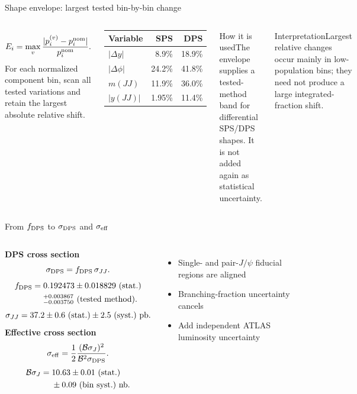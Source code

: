 \documentclass[11pt,aspectratio=169]{beamer}
\begin{document}
\begin{frame}{Shape envelope: largest tested bin-by-bin change}
\begin{columns}[T]\[E_i=\max_v\frac{|p_i^{(v)}-p_i^{\rm nom}|}{p_i^{\rm nom}}.\]For each normalized component bin, scan all tested variations and retain the largest absolute relative shift.\begin{center}\begin{tabular}{lrr}\toprule Variable&SPS&DPS\\\midrule $|\Delta y|$&8.9\%&18.9\%\\$|\Delta\phi|$&24.2\%&41.8\%\\$m(JJ)$&11.9\%&36.0\%\\$|y(JJ)|$&1.95\%&11.4\%\\\bottomrule\end{tabular}\end{center}
\begin{block}{How it is used}The envelope supplies a tested-method band for differential SPS/DPS shapes. It is not added again as statistical uncertainty.\end{block}\begin{alertblock}{Interpretation}Largest relative changes occur mainly in low-population bins; they need not produce a large integrated-fraction shift.\end{alertblock}\end{columns}
\end{frame}

\begin{frame}{From $f_{\rm DPS}$ to $\sigma_{\rm DPS}$ and $\sigma_{\rm eff}$}
\small
\begin{columns}[T]\textbf{DPS cross section}\[\sigma_{\rm DPS}=f_{\rm DPS}\,\sigma_{JJ}.\]\[\begin{aligned}f_{\rm DPS}={}&0.192473\pm0.018829\ {\rm(stat.)}\\&{}^{+0.003867}_{-0.003750}\ {\rm(tested\ method)}.\end{aligned}\]\[\sigma_{JJ}=37.2\pm0.6\ {\rm(stat.)}\pm2.5\ {\rm(syst.)}\ {\rm pb}.\]
\textbf{Effective cross section}\[\sigma_{\rm eff}=\frac12\frac{(\mathcal B\sigma_J)^2}{\mathcal B^2\sigma_{\rm DPS}}.\]\[\begin{aligned}\mathcal B\sigma_J={}&10.63\pm0.01\ {\rm(stat.)}\\&\pm0.09\ {\rm(bin\ syst.)}\ {\rm nb}.\end{aligned}\]\begin{itemize}\item Single- and pair-$J/\psi$ fiducial regions are aligned\item Branching-fraction uncertainty cancels\item Add independent ATLAS luminosity uncertainty\end{itemize}\end{columns}
\end{frame}
\end{document}
